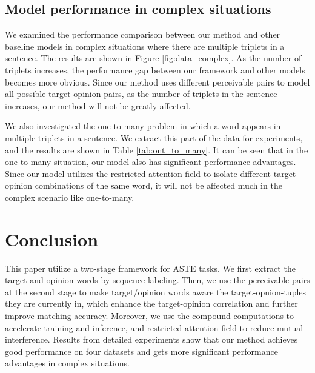 \documentclass[11pt]{article}
\begin{document}
\subsection{Model performance in complex situations}
We examined the performance comparison between our method and other baseline models in complex situations where there are multiple triplets in a sentence. The results are shown in Figure \ref{fig:data_complex}. As the number of triplets increases, the performance gap between our framework and other models becomes more obvious. Since our method uses different perceivable pairs to model all possible target-opinion pairs, as the number of triplets in the sentence increases, our method will not be greatly affected.

We also investigated the one-to-many problem in which a word appears in multiple triplets in a sentence. We extract this part of the data for experiments, and the results are shown in Table \ref{tab:ont_to_many}. It can be seen that in the one-to-many situation, our model also has significant performance advantages. Since our model utilizes the restricted attention field to isolate different target-opinion combinations of the same word, it will not be affected much in the complex scenario like one-to-many. \section{Conclusion}
This paper utilize a two-stage framework for ASTE tasks. We first extract the target and opinion words by sequence labeling. 
Then, we use the perceivable pairs at the second stage to make target/opinion words aware the target-opnion-tuples they are currently in, which enhance the target-opinion correlation and further improve matching accuracy.
Moreover, we use the compound computations to accelerate training and inference, and restricted attention field to reduce mutual interference. Results from detailed experiments show that our method achieves good performance on four datasets and gets more significant performance advantages in complex situations. 


\end{document}
